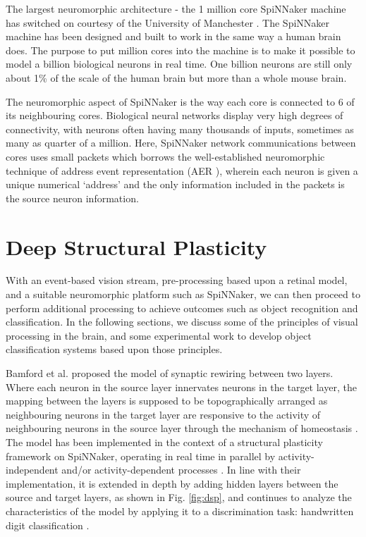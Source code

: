 \documentclass[letterpaper, 10 pt, conference]{ieeeconf}  %
\begin{document}
The largest neuromorphic architecture - the 1 million core SpiNNaker machine has switched on courtesy of the University of Manchester \cite{Furber2020}. 
The SpiNNaker machine has been designed and built to work in the same way a human brain does. 
The purpose to put million cores into the machine is to make it possible to model a billion biological neurons in real time. 
One billion neurons are still only about 1\% of the scale of the human brain but more than a whole mouse brain.

The neuromorphic aspect of SpiNNaker is the way each core is connected to 6 of its neighbouring cores. Biological neural networks display very high degrees of connectivity, with neurons often having many thousands of inputs, sometimes as many as quarter of a million. 
Here, SpiNNaker network communications between cores uses small packets which borrows the well-established neuromorphic technique of address event representation (AER \cite{Mahowald1992}), wherein each neuron is given a unique numerical ‘address’ and the only information included in the packets is the source neuron information.


\section{Deep Structural Plasticity}

With an event-based vision stream, pre-processing based upon a retinal model, and a suitable neuromorphic platform such as SpiNNaker, we can then proceed to perform additional processing to achieve outcomes such as object recognition and classification. In the following sections, we discuss some of the principles of visual processing in the brain, and some experimental work to develop object classification systems based upon those principles.

Bamford et al. \cite{bamford2010synaptic} proposed the model of synaptic rewiring between two layers. 
Where each neuron in the source layer innervates neurons in the target layer, the mapping between the layers is supposed to be topographically arranged as neighbouring neurons in the target layer are responsive to the activity of neighbouring neurons in the source layer \cite{udin1988formation} through the mechanism of homeostasis \cite{Butz2009}. 
The model has been implemented in the context of a structural plasticity framework on SpiNNaker, operating in real time in parallel by activity-independent and/or activity-dependent processes \cite{bogdan2018structural}.
In line with their implementation, it is extended in depth by adding hidden layers between the source and target layers, as shown in Fig. \ref{fig:dsp}, and continues to analyze the characteristics of the model by applying it to a discrimination task: handwritten digit classification \cite{hopkins2018spiking}.
\end{document}
